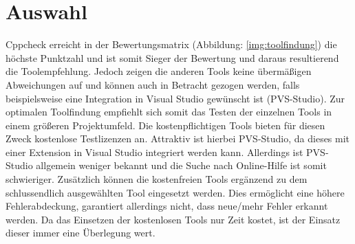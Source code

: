 \section{Auswahl}
\label{sec:auswahl}

Cppcheck erreicht in der Bewertungsmatrix (Abbildung: \ref{img:toolfindung}) die höchste Punktzahl und ist somit Sieger der Bewertung und daraus resultierend die Toolempfehlung. 
Jedoch zeigen die anderen Tools keine übermäßigen Abweichungen auf und können auch in Betracht gezogen werden, falls beispielsweise eine Integration in Visual Studio gewünscht ist 
(PVS-Studio). \newline
Zur optimalen Toolfindung empfiehlt sich somit das Testen der einzelnen Tools in einem größeren Projektumfeld. Die kostenpflichtigen Tools bieten für diesen Zweck kostenlose 
Testlizenzen an. Attraktiv ist hierbei PVS-Studio, da dieses mit einer Extension in Visual Studio integriert werden kann. Allerdings ist PVS-Studio allgemein weniger bekannt und die Suche nach Online-Hilfe ist somit schwieriger. \newline
Zusätzlich können die kostenfreien Tools ergänzend zu dem schlussendlich ausgewählten Tool eingesetzt werden. Dies ermöglicht eine höhere Fehlerabdeckung, garantiert allerdings nicht, 
dass neue/mehr Fehler erkannt werden. Da das Einsetzen der kostenlosen Tools nur Zeit kostet, ist der Einsatz dieser immer eine Überlegung wert.